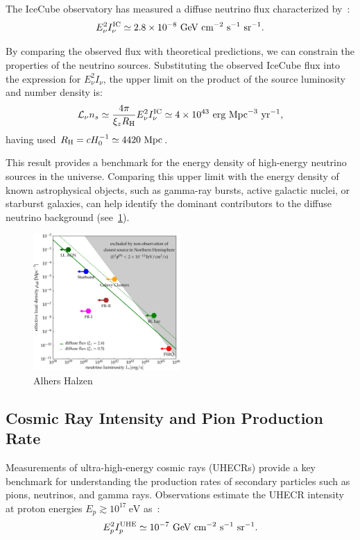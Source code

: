 The IceCube observatory has measured a diffuse neutrino flux characterized by~\cite{}:
\begin{equation}
E_\nu^2 I_\nu^{\rm IC} \simeq 2.8 \times 10^{-8}~\text{GeV}~\text{cm}^{-2}~\text{s}^{-1}~\text{sr}^{-1}.
\end{equation}

By comparing the observed flux with theoretical predictions, we can constrain the properties of the neutrino sources. Substituting the observed IceCube flux into the expression for \(E_\nu^2 I_\nu\), the upper limit on the product of the source luminosity and number density is:
\begin{equation}
\mathcal{L}_\nu n_s \simeq \frac{4\pi}{\xi_z R_{\rm H}} E_\nu^2 I_\nu^{\rm IC} \simeq 4 \times 10^{43}~\text{erg}~\text{Mpc}^{-3}~\text{yr}^{-1},
\end{equation}
having used \(R_{\rm H} = c H_0^{-1} \simeq 4420~\text{Mpc}\). 

This result provides a benchmark for the energy density of high-energy neutrino sources in the universe. Comparing this upper limit with the energy density of known astrophysical objects, such as gamma-ray bursts, active galactic nuclei, or starburst galaxies, can help identify the dominant contributors to the diffuse neutrino background (see~\ref{fig:nuluminosity}). 

\begin{figure}[!t]
\centering
\includegraphics[width=0.5\textwidth]{figures/luminosityDISCOVERY.pdf}
\caption{Alhers Halzen~\cite{Ahlers2018ppnp}}
\label{fig:nuluminosity}
\end{figure}

\subsection{Cosmic Ray Intensity and Pion Production Rate} 

Measurements of ultra-high-energy cosmic rays (UHECRs) provide a key benchmark for understanding the production rates of secondary particles such as pions, neutrinos, and gamma rays. Observations estimate the UHECR intensity at proton energies \(E_p \gtrsim 10^{17}~\text{eV}\) as~\cite{add}:  
\begin{equation}
E_p^2 I^{\rm UHE}_p \simeq 10^{-7}~\text{GeV}~\text{cm}^{-2}~\text{s}^{-1}~\text{sr}^{-1}.
\end{equation}

